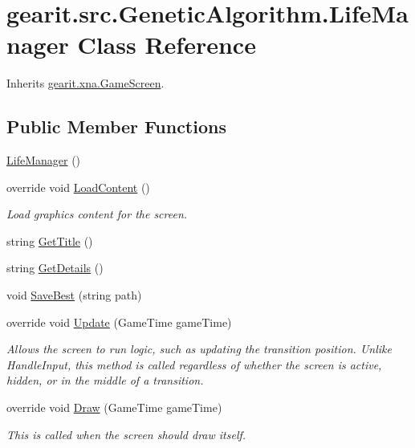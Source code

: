 \hypertarget{classgearit_1_1src_1_1_genetic_algorithm_1_1_life_manager}{\section{gearit.\+src.\+Genetic\+Algorithm.\+Life\+Manager Class Reference}
\label{classgearit_1_1src_1_1_genetic_algorithm_1_1_life_manager}
}


Inherits \hyperlink{classgearit_1_1xna_1_1_game_screen}{gearit.\+xna.\+Game\+Screen}.

\subsection*{Public Member Functions}
\begin{DoxyCompactItemize}
\item 
\hyperlink{classgearit_1_1src_1_1_genetic_algorithm_1_1_life_manager_a92beb9bd26207c569f4a4599c13fe764}{Life\+Manager} ()
\item 
override void \hyperlink{classgearit_1_1src_1_1_genetic_algorithm_1_1_life_manager_a8973893d4b7c74d260fa39ba835f6d46}{Load\+Content} ()
\begin{DoxyCompactList}\small\item\em Load graphics content for the screen. \end{DoxyCompactList}\item 
string \hyperlink{classgearit_1_1src_1_1_genetic_algorithm_1_1_life_manager_a5cb457034e0c9d8e163e86fc600f6fda}{Get\+Title} ()
\item 
string \hyperlink{classgearit_1_1src_1_1_genetic_algorithm_1_1_life_manager_a4eef38a85f5f7d2bb16d7a78205a9ebf}{Get\+Details} ()
\item 
void \hyperlink{classgearit_1_1src_1_1_genetic_algorithm_1_1_life_manager_a489e6872b3f0b8f6b0cc631082618e09}{Save\+Best} (string path)
\item 
override void \hyperlink{classgearit_1_1src_1_1_genetic_algorithm_1_1_life_manager_a1a8735b1652c814b152ca39c47821953}{Update} (Game\+Time game\+Time)
\begin{DoxyCompactList}\small\item\em Allows the screen to run logic, such as updating the transition position. Unlike Handle\+Input, this method is called regardless of whether the screen is active, hidden, or in the middle of a transition. \end{DoxyCompactList}\item 
override void \hyperlink{classgearit_1_1src_1_1_genetic_algorithm_1_1_life_manager_a8e78827f7b586865b1be910330ce64fb}{Draw} (Game\+Time game\+Time)
\begin{DoxyCompactList}\small\item\em This is called when the screen should draw itself. \end{DoxyCompactList}\end{DoxyCompactItemize}
